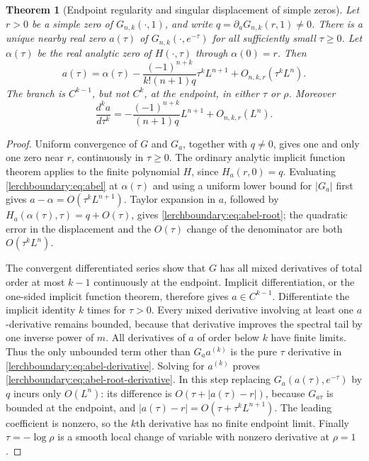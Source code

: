 \documentclass[11pt,a4paper]{article}
\newtheorem{theorem}{Theorem}[section]
\theoremstyle{definition}
\theoremstyle{remark}
\numberwithin{equation}{section}
\begin{document}
\begin{theorem}[Endpoint regularity and singular displacement of simple zeros]
\label{lerchboundary:thm:abel-root}
Let $r>0$ be a simple zero of $G_{n,k}(\cdot,1)$, and write
$q=\partial_aG_{n,k}(r,1)\neq0$.
There is a unique nearby real zero $a(\tau)$ of
$G_{n,k}(\cdot,e^{-\tau})$ for all sufficiently small $\tau\geq0$.
Let $\alpha(\tau)$ be the real analytic zero of $H(\cdot,\tau)$
through $\alpha(0)=r$. Then
\begin{equation}\label{lerchboundary:eq:abel-root}
 a(\tau)=\alpha(\tau)
 -\frac{(-1)^{n+k}}{k!(n+1)q}\tau^k L^{n+1}
 +O_{n,k,r}(\tau^kL^n).
\end{equation}
The branch is $C^{k-1}$, but not $C^k$, at the endpoint, in either
$\tau$ or $\rho$. Moreover
\begin{equation}\label{lerchboundary:eq:abel-root-derivative}
 \frac{d^k a}{d\tau^k}
 =-\frac{(-1)^{n+k}}{(n+1)q}L^{n+1}+O_{n,k,r}(L^n).
\end{equation}
\end{theorem}

\begin{proof}
Uniform convergence of $G$ and $G_a$, together with $q\neq0$, gives
one and only one zero near $r$, continuously in $\tau\geq0$.
The ordinary analytic implicit function theorem applies to the finite
polynomial $H$, since $H_a(r,0)=q$.
Evaluating \eqref{lerchboundary:eq:abel} at $\alpha(\tau)$ and using a
uniform lower bound for $|G_a|$ first gives
$a-\alpha=O(\tau^kL^{n+1})$.  Taylor expansion in $a$, followed by
$H_a(\alpha(\tau),\tau)=q+O(\tau)$, gives
\eqref{lerchboundary:eq:abel-root}; the quadratic error in the
displacement and the $O(\tau)$ change of the denominator are both
$O(\tau^kL^n)$.

The convergent differentiated series show that $G$ has all mixed
derivatives of total order at most $k-1$ continuously at the endpoint.
Implicit differentiation, or the one-sided implicit function theorem,
therefore gives $a\in C^{k-1}$. Differentiate the implicit identity
$k$ times for $\tau>0$.  Every mixed derivative involving at least
one $a$-derivative remains bounded, because that derivative improves
the spectral tail by one inverse power of $m$. All derivatives of
$a$ of order below $k$ have finite limits. Thus the only unbounded
term other than $G_a a^{(k)}$ is the pure $\tau$ derivative in
\eqref{lerchboundary:eq:abel-derivative}. Solving for $a^{(k)}$ proves
\eqref{lerchboundary:eq:abel-root-derivative}. In this step replacing
$G_a(a(\tau),e^{-\tau})$ by $q$ incurs only $O(L^n)$:
its difference is $O(\tau+|a(\tau)-r|)$, because $G_{a\tau}$ is
bounded at the endpoint, and
$|a(\tau)-r|=O(\tau+\tau^kL^{n+1})$.
The leading coefficient is nonzero, so the $k$th derivative has no
finite endpoint limit.  Finally $\tau=-\log\rho$ is a smooth local
change of variable with nonzero derivative at $\rho=1$.
\end{proof}
\end{document}
